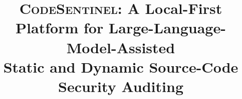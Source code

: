 \documentclass[conference]{IEEEtran}
\newcommand{\cs}{\textsc{CodeSentinel}\xspace}
\begin{document}
\title{\cs: A Local-First Platform for Large-Language-Model-Assisted\\
Static and Dynamic Source-Code Security Auditing}

\author{%
}

\maketitle












\balance


\end{document}
